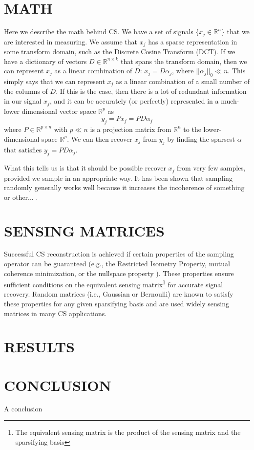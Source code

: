 \documentclass[journal]{IEEEtran}
\begin{document}
\section{MATH}

Here we describe the math behind CS. We have a set of signals $\{x_j \in \mathbb{R}^n\}$ that we are interested in measuring. We assume that $x_j$ has a sparse representation in some transform domain, such as the Discrete Cosine Transform (DCT). If we have a dictionary of vectors $D \in \mathbb{R}^{n\times k}$ that spans the transform domain, then we can represent $x_j$ as a linear combination of $D$: $x_j=D\alpha_j$, where $||\alpha_j||_0 \ll n$. This simply says that we can represent $x_j$ as a linear combination of a small number of the columns of $D$. If this is the case, then there is a lot of redundant information in our signal $x_j$, and it can be accurately (or perfectly) represented in a much-lower dimensional vector space $\mathbb{R}^p$ as $$y_j=Px_j=PD\alpha_j$$ where $P \in \mathbb{R}^{p\times n}$ with $p \ll n$ is a projection matrix from $\mathbb{R}^n$ to the lower-dimensional space $\mathbb{R}^p$. We can then recover $x_j$ from $y_j$ by finding the sparsest $\alpha$ that satisfies $y_j=PD\alpha_j$.

What this tells us is that it should be possible recover $x_j$ from very few samples, provided we sample in an appropriate way. It has been shown that sampling randomly generally works well because it increases the incoherence of something or other... \cite{somehinggoeshere}.

\section{SENSING MATRICES}

Successful CS reconstruction is achieved if certain properties of the sampling operator can be guaranteed (e.g., the Restricted Isometry Property, mutual coherence minimization, or the nullspace property \cite{tcs}).  These properties ensure sufficient conditions on the equivalent sensing matrix\footnote{The equivalent sensing matrix is the product of the sensing matrix and the sparsifying basis} for accurate signal recovery. Random matrices (i.e., Gaussian or Bernoulli) are known to satisfy these properties for any given sparsifying basis and are used widely sensing matrices in many CS applications.

\section{RESULTS}

\section{CONCLUSION}

A conclusion



{}
\end{document}
